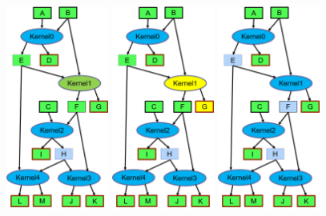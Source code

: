 \documentclass{article}
\begin{document}
\begin{figure}
    \centering
    \includegraphics[width=0.3\textwidth]{DAG2.png}\hfill
    \includegraphics[width=0.3\textwidth]{DAG1.png}\hfill
    \includegraphics[width=0.3\textwidth]{DAG0.png}
    

\end{figure}
\end{document}

